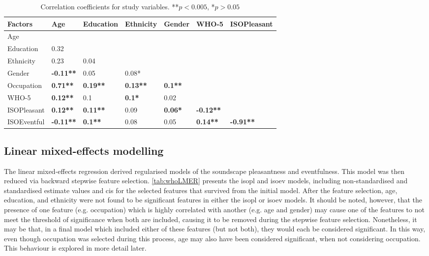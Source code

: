 \begin{table}[!ht]
  \centering
  \caption{Correlation coefficients for study variables. **$p<0.005$, *$p>0.05$\label{tab:whoCorr}}
  \begin{tabular}{@{}l|llllll@{}}
  \toprule
  Factors     & Age              & Education       & Ethnicity       & Gender         & WHO-5            & ISOPleasant      \\ \midrule
  Age       &                  &      &               &      &  &  \\
  Education & 0.32             &      &               &      &  &  \\
  Ethnicity & 0.23             & 0.04 &               &      &  &  \\
  Gender    & \textbf{-0.11**} & 0.05 & 0.08*         &      &  &  \\
  Occupation  & \textbf{0.71**}  & \textbf{0.19**} & \textbf{0.13**} & \textbf{0.1**} &                  &                  \\
  WHO-5     & \textbf{0.12**}  & 0.1  & \textbf{0.1*} & 0.02 &  &  \\
  ISOPleasant & \textbf{0.12**}  & \textbf{0.11**} & 0.09            & \textbf{0.06*} & \textbf{-0.12**} &                  \\
  ISOEventful & \textbf{-0.11**} & \textbf{0.1**}  & 0.08            & 0.05           & \textbf{0.14**}  & \textbf{-0.91**} \\ \bottomrule
  \end{tabular}
  \end{table}

  \subsection{Linear mixed-effects modelling}
\label{sec:whoLMERinit}
  The linear mixed-effects regression derived regularised models of the soundscape pleasantness and eventfulness. This model was then reduced via backward stepwise feature selection. \cref{tab:whoLMER} presents the \gls{isopl} and \gls{isoev} models, including non-standardised and standardised estimate values and \glspl{ci} for the selected features that survived from the initial model. After the feature selection, age, education, and ethnicity were not found to be significant features in either the \gls{isopl} or \gls{isoev} models. It should be noted, however, that the presence of one feature (e.g. occupation) which is highly correlated with another (e.g. age and gender) may cause one of the features to not meet the threshold of significance when both are included, causing it to be removed during the stepwise feature selection. Nonetheless, it may be that, in a final model which included either of these features (but not both), they would each be considered significant. In this way, even though occupation was selected during this process, age may also have been considered significant, when not considering occupation. This behaviour is explored in more detail later.

